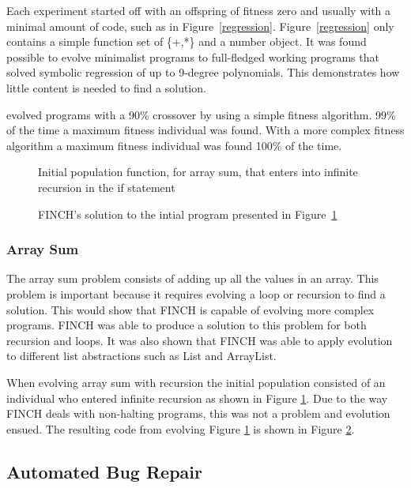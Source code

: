 \documentclass{sig-alternate}
\begin{document}
Each experiment started off with an offspring of fitness zero and usually with a minimal amount of code, such as in Figure~\ref{regression}. Figure~\ref{regression} only contains a simple function set of \{+,*\} and a number object. It was found possible  to evolve minimalist programs to full-fledged working programs that solved symbolic regression of up to 9-degree polynomials. This demonstrates how little content is needed to find a solution.\par

\cite{FINCH:2011} evolved programs with a 90\% crossover by using a simple fitness algorithm. 99\% of the time a maximum fitness individual was found. With a more complex fitness algorithm a maximum fitness individual was found 100\% of the time.


\begin{figure}
\centering
{}
\caption{Initial population function, for array sum, that enters into infinite recursion in the if statement}
\label{initial rec}
\end{figure}

\begin{figure}
\centering
{}
\caption{FINCH's solution to the intial program presented in Figure~\ref{initial rec}}
\label{final rec}
\end{figure}

\subsubsection{Array Sum}
The array sum problem consists of adding up all the values in an array. This problem is important because it requires evolving a loop or recursion to find a solution. This would show that FINCH is capable of evolving more complex programs. FINCH was able to produce a solution to this problem for both recursion and loops. It was also shown that FINCH was able to apply evolution to different list abstractions such as List and ArrayList.

When evolving array sum with recursion the initial population consisted of an individual who entered infinite recursion as shown in Figure \ref{initial rec}. Due to the way FINCH deals with non-halting programs, this was not a problem and evolution ensued. The resulting code from evolving Figure \ref{initial rec} is shown in Figure \ref{final rec}.


\subsection{Automated Bug Repair}
\end{document}

